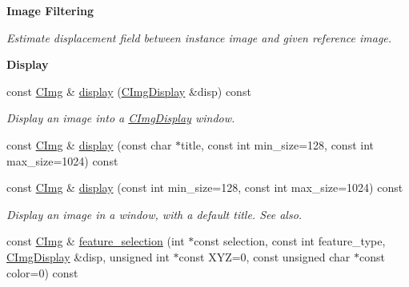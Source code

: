 \begin{Indent}{\bf Image Filtering}
\begin{DoxyCompactItemize}
\begin{DoxyCompactList}\small\item\em Estimate displacement field between instance image and given reference image. \item\end{DoxyCompactList}\end{DoxyCompactItemize}
\end{Indent}
\begin{Indent}{\bf Display}\par
{\em \label{_amgrpb9987a246a537f4fe86f1f2e3d10dbdb}
 }\begin{DoxyCompactItemize}
\item 
\hypertarget{structcimg__library_1_1_c_img_aab8c37b9dc626927623f68759fe83e83}{
const \hyperlink{structcimg__library_1_1_c_img}{CImg} \& \hyperlink{structcimg__library_1_1_c_img_aab8c37b9dc626927623f68759fe83e83}{display} (\hyperlink{structcimg__library_1_1_c_img_display}{CImgDisplay} \&disp) const }
\label{structcimg__library_1_1_c_img_aab8c37b9dc626927623f68759fe83e83}

\begin{DoxyCompactList}\small\item\em Display an image into a \hyperlink{structcimg__library_1_1_c_img_display}{CImgDisplay} window. \item\end{DoxyCompactList}\item 
const \hyperlink{structcimg__library_1_1_c_img}{CImg} \& \hyperlink{structcimg__library_1_1_c_img_aade198c2b2e6f89be49a4cfa69fcdce4}{display} (const char $\ast$title, const int min\_\-size=128, const int max\_\-size=1024) const 
\item 
const \hyperlink{structcimg__library_1_1_c_img}{CImg} \& \hyperlink{structcimg__library_1_1_c_img_a941988a0ddc5b2ba903a3f059c7fdb1f}{display} (const int min\_\-size=128, const int max\_\-size=1024) const 
\begin{DoxyCompactList}\small\item\em Display an image in a window, with a default title. See also. \item\end{DoxyCompactList}\item 
\hypertarget{structcimg__library_1_1_c_img_ae7d87a654447b781e9c5a5d0db77fdf7}{
const \hyperlink{structcimg__library_1_1_c_img}{CImg} \& \hyperlink{structcimg__library_1_1_c_img_ae7d87a654447b781e9c5a5d0db77fdf7}{feature\_\-selection} (int $\ast$const selection, const int feature\_\-type, \hyperlink{structcimg__library_1_1_c_img_display}{CImgDisplay} \&disp, unsigned int $\ast$const XYZ=0, const unsigned char $\ast$const color=0) const }
\label{structcimg__library_1_1_c_img_ae7d87a654447b781e9c5a5d0db77fdf7}


\end{DoxyCompactItemize}
\end{Indent}
